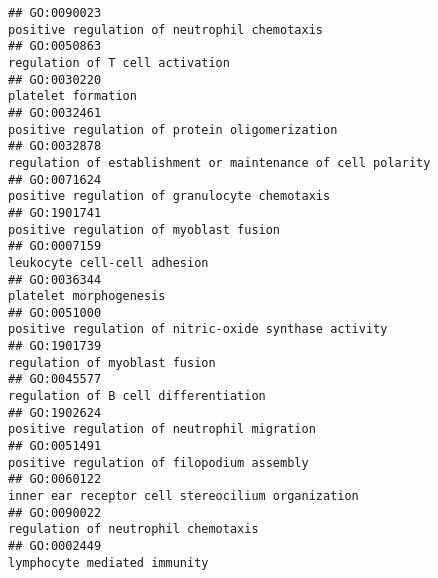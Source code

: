 \documentclass[
]{article}
\begin{document}
\begin{verbatim}
## GO:0090023                                                                                                     positive regulation of neutrophil chemotaxis
## GO:0050863                                                                                                                  regulation of T cell activation
## GO:0030220                                                                                                                               platelet formation
## GO:0032461                                                                                                   positive regulation of protein oligomerization
## GO:0032878                                                                                      regulation of establishment or maintenance of cell polarity
## GO:0071624                                                                                                    positive regulation of granulocyte chemotaxis
## GO:1901741                                                                                                           positive regulation of myoblast fusion
## GO:0007159                                                                                                                     leukocyte cell-cell adhesion
## GO:0036344                                                                                                                           platelet morphogenesis
## GO:0051000                                                                                            positive regulation of nitric-oxide synthase activity
## GO:1901739                                                                                                                    regulation of myoblast fusion
## GO:0045577                                                                                                             regulation of B cell differentiation
## GO:1902624                                                                                                      positive regulation of neutrophil migration
## GO:0051491                                                                                                       positive regulation of filopodium assembly
## GO:0060122                                                                                                inner ear receptor cell stereocilium organization
## GO:0090022                                                                                                              regulation of neutrophil chemotaxis
## GO:0002449                                                                                                                     lymphocyte mediated immunity

\end{verbatim}
\end{document}
